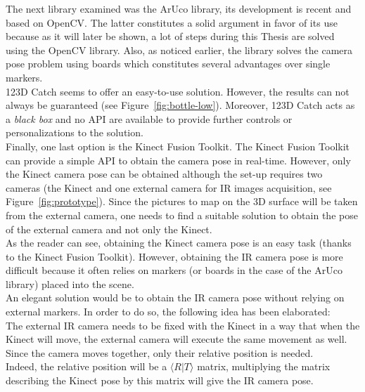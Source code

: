 The next library examined was the ArUco library, its development is recent and based on OpenCV. The latter constitutes a solid argument in favor of its use because as it will later be shown, a lot of steps during this Thesis are solved using the OpenCV library. Also, as noticed earlier, the library solves the camera pose problem using boards which constitutes several advantages over single markers.\\

123D Catch seems to offer an easy-to-use solution. However, the results can not always be guaranteed (see Figure~\ref{fig:bottle-low}). Moreover, 123D Catch acts as a \textit{black box} and no API are available to provide further controls or personalizations to the solution.\\

Finally, one last option is the Kinect Fusion Toolkit. The Kinect Fusion Toolkit can provide a simple API to obtain the camera pose in real-time. However, only the Kinect camera pose can be obtained although the set-up requires two cameras (the Kinect and one external camera for IR images acquisition, see Figure~\ref{fig:prototype}). Since the pictures to map on the 3D surface will be taken from the external camera, one needs to find a suitable solution to obtain the pose of the external camera and not only the Kinect.\\

As the reader can see, obtaining the Kinect camera pose is an easy task (thanks to the Kinect Fusion Toolkit). However, obtaining the IR camera pose is more difficult because it often relies on markers (or boards in the case of the ArUco library) placed into the scene. \\

An elegant solution would be to obtain the IR camera pose without relying on external markers. In order to do so, the following idea has been elaborated:\\

The external IR camera needs to be fixed with the Kinect in a way that when the Kinect will move, the external camera will execute the same movement as well. Since the camera moves together, only their relative position is needed.\\ 

Indeed, the relative position will be a $\langle R\vert T\rangle$ matrix, multiplying the matrix describing the Kinect pose by this matrix will give the IR camera pose.\\

